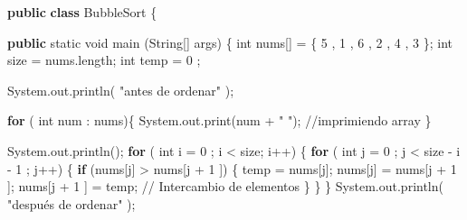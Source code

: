 \documentclass[
  spanish,
  letterpaper,
  DIV=11,
  numbers=noendperiod]{scrreprt}
\newenvironment{Shaded}{\begin{snugshade}}{\end{snugshade}}
\newcommand{\BuiltInTok}[1]{\textcolor[rgb]{0.00,0.23,0.31}{#1}}
\newcommand{\CommentTok}[1]{\textcolor[rgb]{0.37,0.37,0.37}{#1}}
\newcommand{\ControlFlowTok}[1]{\textcolor[rgb]{0.00,0.23,0.31}{\textbf{#1}}}
\newcommand{\DataTypeTok}[1]{\textcolor[rgb]{0.68,0.00,0.00}{#1}}
\newcommand{\DecValTok}[1]{\textcolor[rgb]{0.68,0.00,0.00}{#1}}
\newcommand{\FunctionTok}[1]{\textcolor[rgb]{0.28,0.35,0.67}{#1}}
\newcommand{\KeywordTok}[1]{\textcolor[rgb]{0.00,0.23,0.31}{\textbf{#1}}}
\newcommand{\NormalTok}[1]{\textcolor[rgb]{0.00,0.23,0.31}{#1}}
\newcommand{\OperatorTok}[1]{\textcolor[rgb]{0.37,0.37,0.37}{#1}}
\newcommand{\StringTok}[1]{\textcolor[rgb]{0.13,0.47,0.30}{#1}}
\begin{document}
\begin{Shaded}
\begin{Highlighting}[]
\KeywordTok{public}  \KeywordTok{class}\NormalTok{  BubbleSort }\OperatorTok{\{} 

 \KeywordTok{public}  \DataTypeTok{static}  \DataTypeTok{void}  \FunctionTok{main} \OperatorTok{(}\BuiltInTok{String}\OperatorTok{[]}\NormalTok{ args}\OperatorTok{)} \OperatorTok{\{} 
     \DataTypeTok{int}\NormalTok{ nums}\OperatorTok{[]} \OperatorTok{=} \OperatorTok{\{} \DecValTok{5} \OperatorTok{,} \DecValTok{1} \OperatorTok{,} \DecValTok{6} \OperatorTok{,} \DecValTok{2} \OperatorTok{,} \DecValTok{4} \OperatorTok{,} \DecValTok{3} \OperatorTok{\};} 
     \DataTypeTok{int}\NormalTok{  size  }\OperatorTok{=}\NormalTok{ nums}\OperatorTok{.}\FunctionTok{length}\OperatorTok{;} 
     \DataTypeTok{int}\NormalTok{  temp  }\OperatorTok{=}  \DecValTok{0} \OperatorTok{;} 
     
     \BuiltInTok{System}\OperatorTok{.}\FunctionTok{out}\OperatorTok{.}\FunctionTok{println}\OperatorTok{(} \StringTok{"antes de ordenar"} \OperatorTok{);} 
    
     \ControlFlowTok{for} \OperatorTok{(} \DataTypeTok{int}\NormalTok{ num }\OperatorTok{:}\NormalTok{ nums}\OperatorTok{)\{}                                           
         \BuiltInTok{System}\OperatorTok{.}\FunctionTok{out}\OperatorTok{.}\FunctionTok{print}\OperatorTok{(}\NormalTok{num }\OperatorTok{+} \StringTok{" "}\OperatorTok{);}      \CommentTok{//imprimiendo array}
      \OperatorTok{\}} 
    
        \BuiltInTok{System}\OperatorTok{.}\FunctionTok{out}\OperatorTok{.}\FunctionTok{println}\OperatorTok{();}   
       \ControlFlowTok{for} \OperatorTok{(} \DataTypeTok{int}\NormalTok{  i  }\OperatorTok{=}  \DecValTok{0} \OperatorTok{;}\NormalTok{ i }\OperatorTok{\textless{}}\NormalTok{ size}\OperatorTok{;}\NormalTok{ i}\OperatorTok{++)} \OperatorTok{\{} 
        \ControlFlowTok{for} \OperatorTok{(} \DataTypeTok{int}\NormalTok{  j  }\OperatorTok{=}  \DecValTok{0} \OperatorTok{;}\NormalTok{ j }\OperatorTok{\textless{}}\NormalTok{ size }\OperatorTok{{-}}\NormalTok{ i }\OperatorTok{{-}} \DecValTok{1} \OperatorTok{;}\NormalTok{ j}\OperatorTok{++)} \OperatorTok{\{} 
            \ControlFlowTok{if} \OperatorTok{(}\NormalTok{nums}\OperatorTok{[}\NormalTok{j}\OperatorTok{]} \OperatorTok{\textgreater{}}\NormalTok{ nums}\OperatorTok{[}\NormalTok{j }\OperatorTok{+} \DecValTok{1} \OperatorTok{])} \OperatorTok{\{} 
\NormalTok{                temp }\OperatorTok{=}\NormalTok{ nums}\OperatorTok{[}\NormalTok{j}\OperatorTok{];} 
\NormalTok{                nums}\OperatorTok{[}\NormalTok{j}\OperatorTok{]} \OperatorTok{=}\NormalTok{ nums}\OperatorTok{[}\NormalTok{j }\OperatorTok{+} \DecValTok{1} \OperatorTok{];} 
\NormalTok{                nums}\OperatorTok{[}\NormalTok{j }\OperatorTok{+} \DecValTok{1} \OperatorTok{]} \OperatorTok{=}\NormalTok{ temp}\OperatorTok{;} \CommentTok{// Intercambio de elementos}
             \OperatorTok{\}} 
          \OperatorTok{\}} 
       \OperatorTok{\}} 
     \BuiltInTok{System}\OperatorTok{.}\FunctionTok{out}\OperatorTok{.}\FunctionTok{println}\OperatorTok{(} \StringTok{"después de ordenar"} \OperatorTok{);} 
    

\end{Highlighting}
\end{Shaded}
\end{document}
